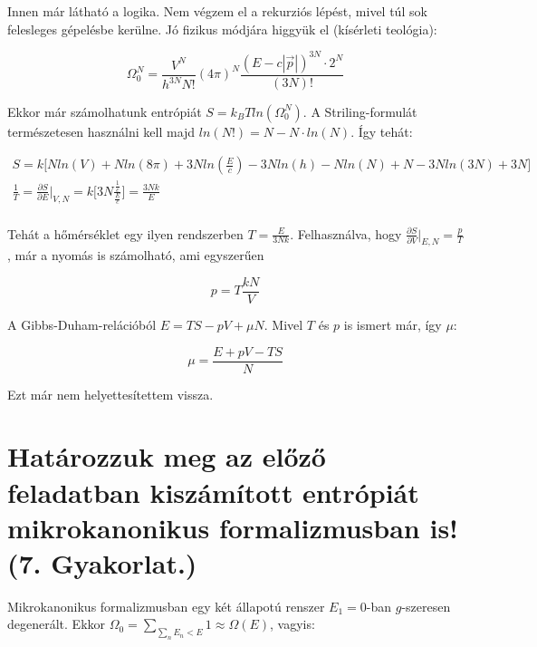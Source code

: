\documentclass[a4paper,12pt]{article}
\begin{document}
\par Innen már látható a logika. Nem végzem el a rekurziós lépést, mivel túl sok felesleges gépelésbe kerülne. Jó fizikus módjára higgyük el (kísérleti teológia):

\begin{equation}
\Omega_{0}^{N} = \frac{V^{N}}{h^{3N}N!}(4\pi)^{N}\frac{(E - c|\vec{p}|)^{3N}\cdot 2^{N}}{(3N)!}
\end{equation}

\par Ekkor már számolhatunk entrópiát $S = k_{B}Tln(\Omega_{0}^{N})$. A Striling-formulát természetesen használni kell majd $ln(N!) = N - N\cdot ln(N)$. Így tehát:

\begin{equation*}
\begin{gathered}
S = k\Big[Nln(V) + Nln(8\pi) + 3Nln(\frac{E}{c}) - 3Nln(h) - Nln(N) + N - 3Nln(3N) + 3N\Big] \\
\frac{1}{T} = \frac{\partial S}{\partial E}\Big|_{V,N} = k\Big[3N\frac{\frac{1}{c}}{\frac{E}{c}}\Big] = \frac{3Nk}{E} \\
\end{gathered}
\end{equation*}

\par Tehát a hőmérséklet egy ilyen rendszerben $T = \frac{E}{3Nk}$. Felhasználva, hogy $\frac{\partial S}{\partial V}\Big|_{E,N} = \frac{p}{T}$, már a nyomás is számolható, ami egyszerűen

\begin{equation*}
p = T\frac{kN}{V}
\end{equation*}

\par A Gibbs-Duham-relációból $E = TS - pV + \mu N$. Mivel $T$ és $p$ is ismert már, így $\mu$:

\begin{equation*}
\mu = \frac{E + pV - TS}{N}
\end{equation*}

\par Ezt már nem helyettesítettem vissza.

\section{Határozzuk meg az előző feladatban kiszámított entrópiát mikrokanonikus formalizmusban is! (7. Gyakorlat.)}

\par Mikrokanonikus formalizmusban egy két állapotú renszer $E_{1} = 0$-ban $g$-szeresen degenerált. Ekkor $\Omega_{0} = \sum_{\sum_{n}E_{n} < E}1 \approx \Omega(E)$, vagyis:
\end{document}
